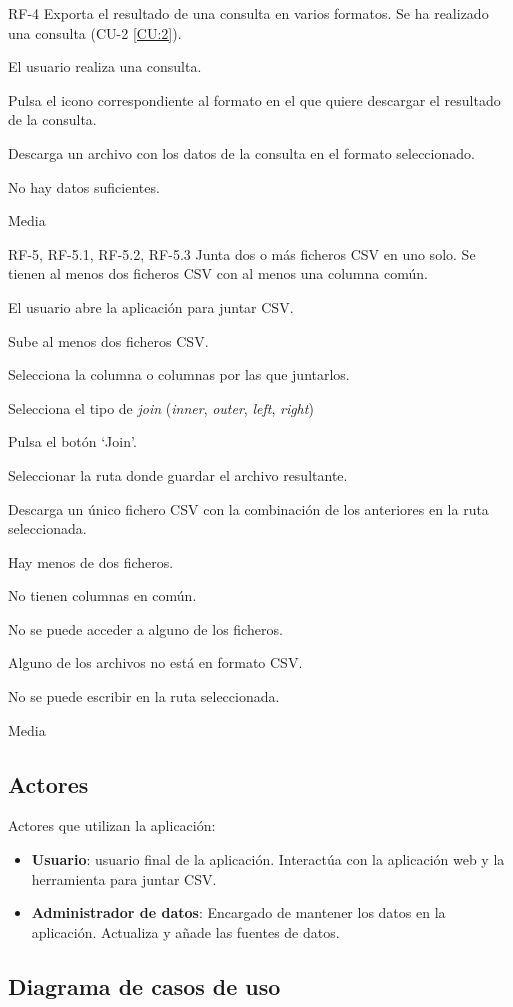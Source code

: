 
{RF-4}
{Exporta el resultado de una consulta en varios formatos.}
{Se ha realizado una consulta (CU-2 \ref{CU:2}).}
{
	\item El usuario realiza una consulta.
	\item Pulsa el icono correspondiente al formato en el que quiere descargar el resultado de la consulta.
}
{Descarga un archivo con los datos de la consulta en el formato seleccionado.}
{
	\item No hay datos suficientes.
}
{Media}


{RF-5, RF-5.1, RF-5.2, RF-5.3}
{Junta dos o más ficheros CSV en uno solo.}
{Se tienen al menos dos ficheros CSV con al menos una columna común.}
{
	\item El usuario abre la aplicación para juntar CSV.
	\item Sube al menos dos ficheros CSV.
	\item Selecciona la columna o columnas por las que juntarlos.
	\item Selecciona el tipo de \textit{join} (\textit{inner}, \textit{outer}, \textit{left}, \textit{right})
	\item Pulsa el botón `Join'.
	\item Seleccionar la ruta donde guardar el archivo resultante.
}
{Descarga un único fichero CSV con la combinación de los anteriores en la ruta seleccionada.}
{
	\item Hay menos de dos ficheros.
	\item No tienen columnas en común.
	\item No se puede acceder a alguno de los ficheros.
	\item Alguno de los archivos no está en formato CSV.
	\item No se puede escribir en la ruta seleccionada.
}
{Media}

\subsection{Actores}

Actores que utilizan la aplicación:

\begin{itemize}
	\item \textbf{Usuario}: usuario final de la aplicación. Interactúa con la aplicación web y la herramienta para juntar CSV.
	\item \textbf{Administrador de datos}: Encargado de mantener los datos en la aplicación. Actualiza y añade las fuentes de datos.
\end{itemize}

\subsection{Diagrama de casos de uso}

